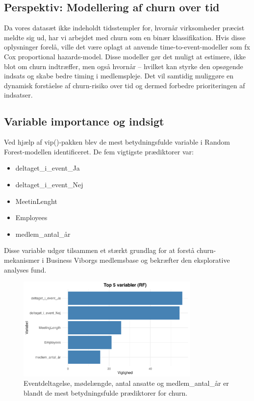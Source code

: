 \documentclass[
  11pt,
  letterpaper,
  DIV=11,
  numbers=noendperiod]{scrartcl}
\providecommand{\tightlist}{%
  \setlength{\itemsep}{0pt}\setlength{\parskip}{0pt}}\usepackage{longtable,booktabs,array}
\begin{document}
\subsection{Perspektiv: Modellering af churn over
tid}\label{perspektiv-modellering-af-churn-over-tid}

Da vores datasæt ikke indeholdt tidsstempler for, hvornår virksomheder
præcist meldte sig ud, har vi arbejdet med churn som en binær
klassifikation. Hvis disse oplysninger forelå, ville det være oplagt at
anvende time-to-event-modeller som fx Cox proportional hazards-model.
Disse modeller gør det muligt at estimere, ikke blot om churn
indtræffer, men også hvornår -- hvilket kan styrke den opsøgende indsats
og skabe bedre timing i medlemspleje. Det vil samtidig muliggøre en
dynamisk forståelse af churn-risiko over tid og dermed forbedre
prioriteringen af indsatser.

\subsection{Variable importance og
indsigt}\label{variable-importance-og-indsigt}

Ved hjælp af vip()-pakken blev de mest betydningsfulde variable i Random
Forest-modellen identificeret. De fem vigtigste prædiktorer var:

\begin{itemize}
\tightlist
\item
  deltaget\_i\_event\_Ja
\item
  deltaget\_i\_event\_Nej
\item
  MeetinLenght
\item
  Employees
\item
  medlem\_antal\_år
\end{itemize}

Disse variable udgør tilsammen et stærkt grundlag for at forstå
churn-mekanismer i Business Viborgs medlemsbase og bekræfter den
eksplorative analyses fund.

\begin{figure}[H]

{\centering \includegraphics[width=0.8\textwidth,height=\textheight]{images/8_top_5_variabler_rf.png}

}

\caption{Eventdeltagelse, mødelængde, antal ansatte og medlem\_antal\_år
er blandt de mest betydningsfulde prædiktorer for churn.}

\end{figure}%
\end{document}
